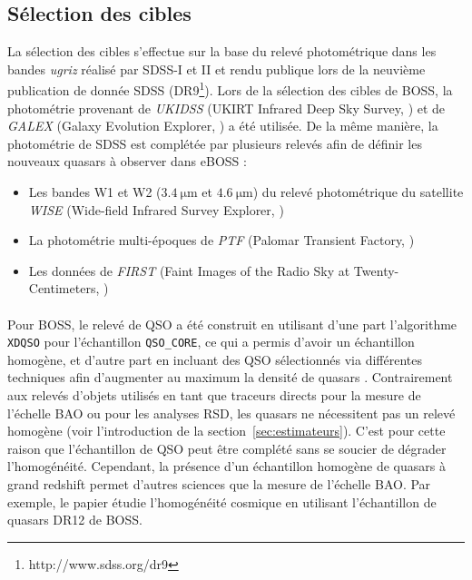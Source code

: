 \subsection{Sélection des cibles}

La sélection des cibles s'effectue sur la base du relevé photométrique dans les bandes \emph{ugriz} réalisé par SDSS-I et II et rendu publique lors de la neuvième publication de donnée SDSS (DR9\footnote{http://www.sdss.org/dr9}).
Lors de la sélection des cibles de BOSS, la photométrie provenant de \emph{UKIDSS} (UKIRT Infrared Deep Sky Survey, \textcite{Lawrence2006}) et de \emph{GALEX} (Galaxy Evolution Explorer, \textcite{Martin2004}) a été utilisée.
De la même manière, la photométrie de SDSS est complétée par plusieurs relevés afin de définir les nouveaux quasars à observer dans eBOSS :
\begin{itemize}
\item Les bandes W1 et W2 ($\SI{3,4}{\micro\meter}$ et $\SI{4,6}{\micro\meter}$) du relevé photométrique du satellite \emph{WISE} (Wide-field Infrared Survey Explorer, \textcite{Wright2010})
\item La photométrie multi-époques de \emph{PTF} (Palomar Transient Factory, \textcite{Law2009})
\item Les données de \emph{FIRST} (Faint Images of the Radio Sky at Twenty-Centimeters, \textcite{Becker1995})
\end{itemize}


\paragraph{} Pour BOSS, le relevé de QSO a été construit en utilisant d'une part l'algorithme \texttt{XDQSO} \autocite{Bovy2010a} pour l'échantillon \texttt{QSO\_CORE}, ce qui a permis d'avoir un échantillon homogène, et d'autre part en incluant des QSO sélectionnés via différentes techniques afin d'augmenter au maximum la densité de quasars \lya{}.
Contrairement aux relevés d'objets utilisés en tant que traceurs directs pour la mesure de l'échelle BAO ou pour les analyses RSD, les quasars \lya{} ne nécessitent pas un relevé homogène (voir l'introduction de la section~\ref{sec:estimateurs}).
C'est pour cette raison que l'échantillon de QSO \lya{} peut être complété sans se soucier de dégrader l'homogénéité.
Cependant, la présence d'un échantillon homogène de quasars à grand redshift permet d'autres sciences que la mesure de l'échelle BAO.
Par exemple, le papier \textcite{Laurent2016} étudie l'homogénéité cosmique en utilisant l'échantillon de quasars DR12 de BOSS.

